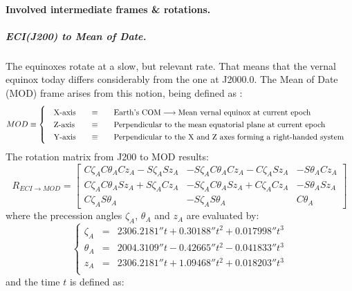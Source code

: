 		\paragraph{Involved intermediate frames \& rotations. \\}
		\subparagraph{ECI(J200) to Mean of Date. \\}
		\indent The equinoxes rotate at a slow, but relevant rate. That means that the vernal equinox today differs considerably from the one at J2000.0. The Mean of Date (MOD) frame arises from this notion, being defined as \cite{Tapley}: \\
		\[
		\arraycolsep=10pt
		\def\arraystretch{1.3}
		MOD\equiv\left\{
		\begin{array}{lll}
		\text{X-axis} 	& \equiv 	& \text{Earth's COM} \longrightarrow \text{Mean vernal equinox at current epoch} \\
		\text{Z-axis} 	& \equiv 	& \text{Perpendicular to the mean equatorial plane at current epoch} \\
		\text{Y-axis} 	& \equiv 	& \text{Perpendicular to the X and Z axes forming a right-handed system} \\
		\end{array}
		\right.
		\]
		\indent The rotation matrix from J200 to MOD results:
		\begin{equation}
		R_{ECI\rightarrow MOD} = 
		\left[ 
		\begin{array}{lll}
		C \zeta_A C \theta_A C z_A - S \zeta_A S z_A 	& - S \zeta_A C \theta_A C z_A - C \zeta_A S z_A 	& -S \theta_A C z_A \\
		C \zeta_A C \theta_A S z_A + S \zeta_A C z_A 	& - S \zeta_A C \theta_A S z_A + C \zeta_A C z_A 	& -S \theta_A S z_A \\
 		C \zeta_A S \theta_A 							& - S \zeta_A S \theta_A 							& C \theta_A
		\end{array}
		\right]
		\label{eq: R_ECI_MOD}
		\end{equation}
		\noindent where the precession angles $\zeta_A$, $\theta_A$ and $z_A$ are evaluated by:
		\[
		\left\{ 
		\begin{array}{lll}
		\zeta_A 	& = & 2306.2181'' t + 0.30188'' t^2 + 0.017998'' t^3 \\
		\theta_A 	& =	& 2004.3109'' t - 0.42665'' t^2 - 0.041833'' t^3 \\
		z_A 		& =	& 2306.2181'' t + 1.09468'' t^2 + 0.018203'' t^3 \\ 
		\end{array}
		\right.
		\]
		\nonindent and the time $t$ is defined as:
